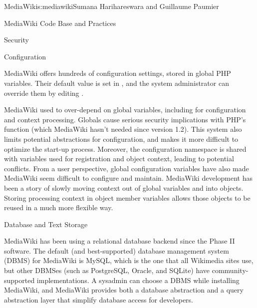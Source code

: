 \begin{aosachapter}{MediaWiki}{s:mediawiki}{Sumana Harihareswara and Guillaume Paumier}
\begin{aosasect1}{MediaWiki Code Base and Practices}
\begin{aosasect2}{Security}
\end{aosasect2}

\begin{aosasect2}{Configuration}

MediaWiki offers hundreds of configuration settings, stored in global
PHP variables. Their default value is set in
, and the system administrator can override
them by editing .

MediaWiki used to over-depend on global variables, including for
configuration and context processing. Globals cause serious security
implications with PHP's  function (which
MediaWiki hasn't needed since version 1.2). This system also limits
potential abstractions for configuration, and makes it more difficult
to optimize the start-up process. Moreover, the configuration
namespace is shared with variables used for registration and object
context, leading to potential conflicts. From a user perspective,
global configuration variables have also made MediaWiki seem difficult
to configure and maintain. MediaWiki development has been a story of
slowly moving context out of global variables and into
objects. Storing processing context in object member variables allows
those objects to be reused in a much more flexible way.

\end{aosasect2}

\end{aosasect1}

\begin{aosasect1}{Database and Text Storage}


MediaWiki has been using a relational database backend since the
Phase II software. The default (and best-supported) database
management system (DBMS) for MediaWiki is MySQL, which is the one that
all Wikimedia sites use, but other DBMSes (such as PostgreSQL, Oracle,
and SQLite) have community-supported implementations. A sysadmin can
choose a DBMS while installing MediaWiki, and MediaWiki provides both
a database abstraction and a query abstraction layer that simplify
database access for developers.


\end{aosasect1}
\end{aosachapter}
